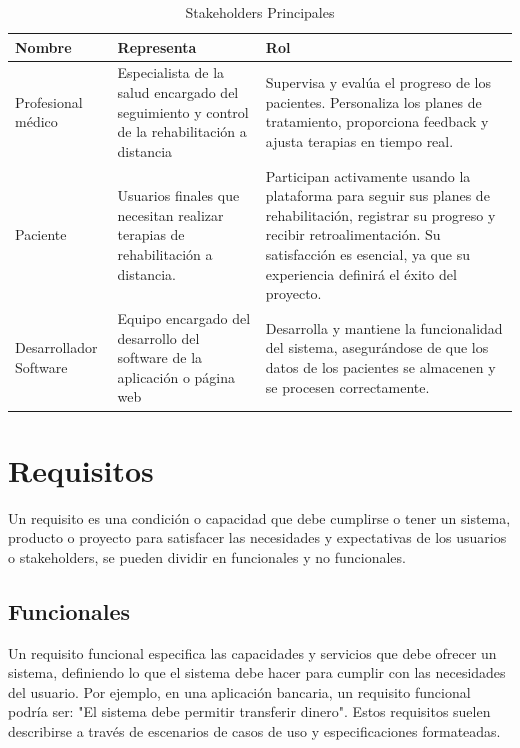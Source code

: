 \documentclass{article}
\begin{document}
	\begin{table}[ht]
		\centering
		\caption{Stakeholders Principales}
		\begin{tabular}{@{} p{3cm} p{6cm} p{7cm} @{}}
			\toprule
			\textbf{Nombre} & \textbf{Representa} & \textbf{Rol} \\
			\midrule
			Profesional médico & 
			Especialista de la salud encargado del seguimiento y control de la rehabilitación a distancia & 
			Supervisa y evalúa el progreso de los pacientes. \newline Personaliza los planes de tratamiento, proporciona feedback y ajusta terapias en tiempo real. \\
			
			\addlinespace
			
			Paciente & 
			Usuarios finales que necesitan realizar terapias de rehabilitación a distancia. & 
			Participan activamente usando la plataforma para seguir sus planes de rehabilitación, registrar su progreso y recibir retroalimentación. Su satisfacción es esencial, ya que su experiencia definirá el éxito del proyecto. \\
			
			\addlinespace
			
			Desarrollador  Software & 
			Equipo encargado del desarrollo del software de la aplicación o página web & 
			Desarrolla y mantiene la funcionalidad del sistema, asegurándose de que los datos de los pacientes se almacenen y se procesen correctamente. \\
			\bottomrule
		\end{tabular}
	\end{table}
	
	

	
	
	\section{Requisitos}
	
	Un requisito es una condición o capacidad que debe cumplirse o tener un sistema, producto o proyecto para satisfacer las necesidades y expectativas de los usuarios o stakeholders, se pueden dividir en funcionales y no funcionales.
	
	\subsection{Funcionales}
	
	Un requisito funcional especifica las capacidades y servicios que debe ofrecer un sistema, definiendo lo que el sistema debe hacer para cumplir con las necesidades del usuario. Por ejemplo, en una aplicación bancaria, un requisito funcional podría ser: "El sistema debe permitir transferir dinero". Estos requisitos suelen describirse a través de escenarios de casos de uso y especificaciones formateadas.
	
\end{document}
